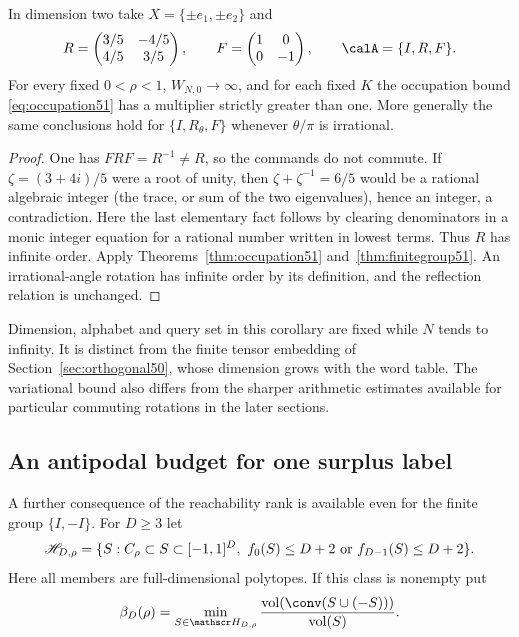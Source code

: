 \begin{corollary}
\label{cor:rational51}
In dimension two take $X=\{\pm e_1,\pm e_2\}$ and
\[
 R=\begin{pmatrix}3/5&-4/5\\4/5&3/5\end{pmatrix},\qquad
 F=\begin{pmatrix}1&0\\0&-1\end{pmatrix},\qquad
 \calA=\{I,R,F\}.
\]
For every fixed $0<\rho<1$, $W_{N,0}\to\infty$, and for each
fixed $K$ the occupation bound \eqref{eq:occupation51} has a multiplier
strictly greater than one. More generally the same conclusions hold
for $\{I,R_\theta,F\}$ whenever $\theta/\pi$ is irrational.
\end{corollary}
\begin{proof}
One has $FRF=R^{-1}\ne R$, so the commands do not commute. If
$\zeta=(3+4i)/5$ were a root of unity, then
$\zeta+\zeta^{-1}=6/5$ would be a rational algebraic integer (the trace, or sum of the two
eigenvalues),
hence an integer, a contradiction. Here the last elementary fact
follows by clearing denominators in a monic integer equation for a
rational number written in lowest terms. Thus $R$ has infinite order.
Apply Theorems~\ref{thm:occupation51} and~\ref{thm:finitegroup51}.
An irrational-angle rotation has infinite order by its definition,
and the reflection relation is unchanged.
\end{proof}

Dimension, alphabet and query set in this corollary are fixed while
$N$ tends to infinity. It is distinct from the finite tensor embedding
of Section~\ref{sec:orthogonal50}, whose dimension grows with the
word table. The variational bound also differs from the sharper
arithmetic estimates available for particular commuting rotations in
the later sections.

\subsection{An antipodal budget for one surplus label}
A further consequence of the reachability rank is available even for
the finite group $\{I,-I\}$. For $D\ge3$ let
\[
 \mathscr H_{D,\rho}=\{S:C_\rho\subset S\subset[-1,1]^D,
       \ f_0(S)\le D+2\ \hbox{or}\ f_{D-1}(S)\le D+2\}.
\]
Here all members are full-dimensional polytopes. If this class is
nonempty put
\begin{equation}\label{eq:antipodal51}
 \beta_D(\rho)=\min_{S\in\mathscr H_{D,\rho}}
       \frac{\operatorname{vol}(\conv(S\cup(-S)))}
            {\operatorname{vol}(S)}.
\end{equation}

